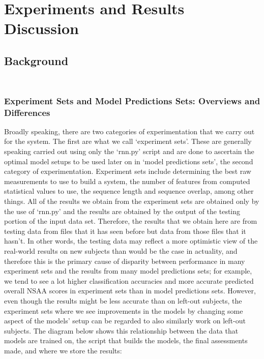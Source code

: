 \documentclass[12pt,twoside]{report}
\begin{document}
\part{Experiments and Results Discussion} 



\chapter{Background\\~\\}




\section{Experiment Sets and Model Predictions Sets: Overviews and Differences}

\quad Broadly speaking, there are two categories of experimentation that we carry out for the system. The first are what we call ‘experiment sets’. These are generally speaking carried out using only the ‘rnn.py’ script and are done to ascertain the optimal model setups to be used later on in ‘model predictions sets’, the second category of experimentation. Experiment sets include determining the best raw measurements to use to build a system, the number of features from computed statistical values to use, the sequence length and sequence overlap, among other things. All of the results we obtain from the experiment sets are obtained only by the use of ‘rnn.py’ and the results are obtained by the output of the testing portion of the input data set. Therefore, the results that we obtain here are from testing data from files that it has seen before but data from those files that it hasn’t. In other words, the testing data may reflect a more optimistic view of the real-world results on new subjects than would be the case in actuality, and therefore this is the primary cause of disparity between performance in many experiment sets and the results from many model predictions sets; for example, we tend to see a lot higher classification accuracies and more accurate predicted overall NSAA scores in experiment sets than in model predictions sets. However, even though the results might be less accurate than on left-out subjects, the experiment sets where we see improvements in the models by changing some aspect of the models’ setup can be regarded to also similarly work on left-out subjects. The diagram below shows this relationship between the data that models are trained on, the script that builds the models, the final assessments made, and where we store the results:
\end{document}
